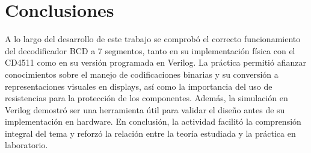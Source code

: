 \chapter{Conclusiones}
A lo largo del desarrollo de este trabajo se comprobó el correcto funcionamiento del decodificador BCD a 7 segmentos,
tanto en su implementación física con el CD4511 como en su versión programada en Verilog. La práctica permitió afianzar
conocimientos sobre el manejo de codificaciones binarias y su conversión a representaciones visuales en displays, así
como la importancia del uso de resistencias para la protección de los componentes. Además, la simulación en Verilog
demostró ser una herramienta útil para validar el diseño antes de su implementación en hardware. En conclusión, la
actividad facilitó la comprensión integral del tema y reforzó la relación entre la teoría estudiada y la práctica en
laboratorio.
